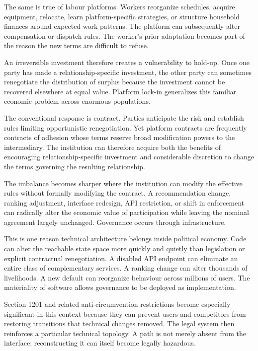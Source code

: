 \documentclass[11pt]{article}
\begin{document}
The same is true of labour platforms. Workers reorganize schedules, acquire equipment, relocate, learn platform-specific strategies, or structure household finances around expected work patterns. The platform can subsequently alter compensation or dispatch rules. The worker's prior adaptation becomes part of the reason the new terms are difficult to refuse.

An irreversible investment therefore creates a vulnerability to hold-up. Once one party has made a relationship-specific investment, the other party can sometimes renegotiate the distribution of surplus because the investment cannot be recovered elsewhere at equal value. Platform lock-in generalizes this familiar economic problem across enormous populations.

The conventional response is contract. Parties anticipate the risk and establish rules limiting opportunistic renegotiation. Yet platform contracts are frequently contracts of adhesion whose terms reserve broad modification powers to the intermediary. The institution can therefore acquire both the benefits of encouraging relationship-specific investment and considerable discretion to change the terms governing the resulting relationship.

The imbalance becomes sharper where the institution can modify the effective rules without formally modifying the contract. A recommendation change, ranking adjustment, interface redesign, API restriction, or shift in enforcement can radically alter the economic value of participation while leaving the nominal agreement largely unchanged. Governance occurs through infrastructure.

This is one reason technical architecture belongs inside political economy. Code can alter the reachable state space more quickly and quietly than legislation or explicit contractual renegotiation. A disabled API endpoint can eliminate an entire class of complementary services. A ranking change can alter thousands of livelihoods. A new default can reorganize behaviour across millions of users. The materiality of software allows governance to be deployed as implementation.

Section 1201 and related anti-circumvention restrictions become especially significant in this context because they can prevent users and competitors from restoring transitions that technical changes removed. The legal system then reinforces a particular technical topology. A path is not merely absent from the interface; reconstructing it can itself become legally hazardous.
\end{document}
